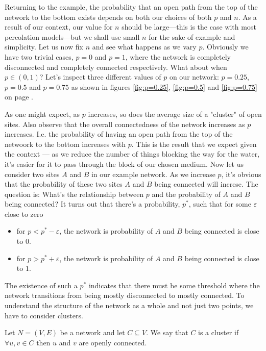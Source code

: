 Returning to the example, the probability that an open path from the top of the network to the bottom exists depends on both our choices of both $p$ and $n$. As a result of our context, our value for $n$ should be
large---this is the case with most percolation models---but we shall use small $n$ for the sake of example and simplicity. Let us now fix $n$ and see what happens as we vary $p$. Obviously we have two trivial cases, $p=0$ and $p=1$,
where the network is completely disconnected and completely connected respectively.
What about when $p\in(0,1)$? Let's inspect three different values of $p$ on our network: $p=0.25$, $p=0.5$ and $p=0.75$ as shown in figures \ref{fig:p=0.25}, \ref{fig:p=0.5} and
\ref{fig:p=0.75} on page \pageref{fig:probabilities}.

As one might expect, as $p$ increases, so does the average size of a "cluster" of open sites. Also observe that the overall connectedness of the network increases as $p$ increases.
I.e. the probability of having an open path from the top of the netwoork to the bottom increases with $p$. This is the result that we expect given the context --- as we reduce the
number of things blocking the way for the water, it's easier for it to pass through the block of our chosen medium. Now let us consider two sites $A$ and $B$ in our example
network. As we increase $p$, it's obvious that the probability of these two sites $A$ and $B$ being connected will increse. The question is: What's the relationship between $p$ and
the probability of $A$ and $B$ being connected? It turns out that there's a probability, $p^*$, such that for some $\varepsilon$ close to zero
\begin{itemize}
  \item for $p < p^* - \varepsilon$, the network is probability of $A$ and $B$ being connected is close to $0$.
  \item for $p > p^* + \varepsilon$, the network is probability of $A$ and $B$ being connected is close to $1$.
\end{itemize}

The existence of such a $p^*$ indicates that there must be some threshold where the network transitions from being mostly disconnected to mostly connected. To understand the
structure of the network as a whole and not just two points, we have to consider clusters.

\begin{definition}\label{def:cluster}
  Let $N = (V, E)$ be a network and let $C \subseteq V$. We say that $C$ is a cluster if $\forall u, v \in C$ then $u$ and $v$ are openly connected.
\end{definition}

